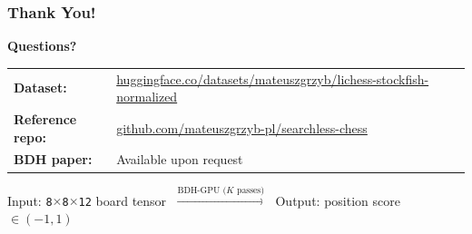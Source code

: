 \documentclass{beamer}
\begin{document}
\begin{frame}
\frametitle{Thank You!}

\begin{center}
\Large
\textbf{Questions?}

\vspace{2em}
\normalsize
\begin{tabular}{ll}
\textbf{Dataset:} & \footnotesize\url{huggingface.co/datasets/mateuszgrzyb/lichess-stockfish-normalized} \\[0.3em]
\textbf{Reference repo:} & \footnotesize\url{github.com/mateuszgrzyb-pl/searchless-chess} \\[0.3em]
\textbf{BDH paper:} & \footnotesize Available upon request \\
\end{tabular}

\vspace{2em}
\begin{block}{}
\centering
\footnotesize
Input: \texttt{8$\times$8$\times$12} board tensor
$\;\xrightarrow{\text{BDH-GPU ($K$ passes)}}\;$
Output: position score $\in (-1, 1)$
\end{block}
\end{center}

\end{frame}


\appendix
\end{document}
